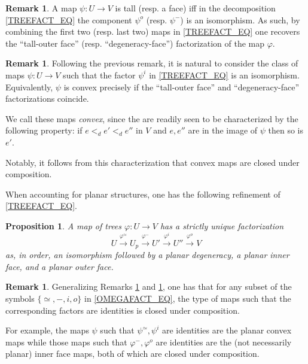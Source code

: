 \documentclass[a4paper,10pt
,draft
]{article}%
\numberwithin{equation}{section}
\numberwithin{figure}{section}
\newtheorem{proposition}[equation]{Proposition}%
\theoremstyle{definition} %
\newtheorem{remark}[equation]{Remark}%
\newcommand{\1}{\ensuremath{\mathbbm 1}}%
\begin{document}
\begin{remark}\label{TODF REM}
	A map $\psi \colon U \to V$
	is tall (resp. a face)
	iff in the decomposition \eqref{TREEFACT_EQ}
	the component $\psi^o$ (resp. $\psi^-$)
	is an isomorphism.
	As such, by combining the 
	first two (resp. last two)
	maps in \eqref{TREEFACT_EQ}
	one recovers the 
	``tall-outer face'' 
	(resp. ``degeneracy-face'')
	factorization of the map $\varphi$.
\end{remark}


\begin{remark}\label{CNVXM REM}
	Following the previous remark, 
	it is natural to consider the class of maps
	$\psi \colon U \to V$ such that
	the factor $\psi^i$ in \eqref{TREEFACT_EQ}
	is an isomorphism.
	Equivalently, $\psi$ is convex precisely if
	the ``tall-outer face'' and ``degeneracy-face''
	factorizations coincide.
	
	We call these maps \textit{convex},
	since the are readily seen to be 
	characterized by the following property:
	if $e <_d e' <_d e''$
	in $V$ and $e,e''$ are in the image of $\psi$
	then so is $e'$.
	
	Notably, it follows from this characterization that convex maps are closed under composition.
\end{remark}


When accounting for planar structures,
one has the following refinement of \eqref{TREEFACT_EQ}.

\begin{proposition}
      A map of trees $\varphi \colon U \to V$ has a strictly unique factorization
      \begin{equation}
            \label{OMEGAFACT_EQ}
            U \xrightarrow{\varphi^{\simeq}} U_p \xrightarrow{\varphi^-} U' \xrightarrow{\varphi^i} U'' \xrightarrow{\varphi^o} V            
      \end{equation}
      as, in order, an isomorphism followed by
      a planar degeneracy, a planar inner face, and a planar outer face.
\end{proposition}


\begin{remark}
	Generalizing Remarks \ref{TODF REM} and \ref{CNVXM REM},
	one has that for any subset 
	of the symbols $\{\simeq,-,i,o\}$
	in \eqref{OMEGAFACT_EQ},
	the type of maps such that 
	the corresponding factors are identities 
	is closed under composition.
	
	For example, the maps $\psi$ such that 
	$\psi^{\simeq},\psi^{i}$
	are identities are the planar convex maps
	while those maps such that
	$\varphi^{-},\varphi^o$
	are identities are the (not necessarily planar) inner face maps,
	both of which are closed under composition.	
\end{remark}
\end{document}
